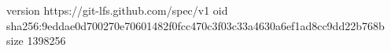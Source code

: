 version https://git-lfs.github.com/spec/v1
oid sha256:9eddae0d700270e70601482f0fcc470c3f03c33a4630a6ef1ad8cc9dd22b768b
size 1398256

